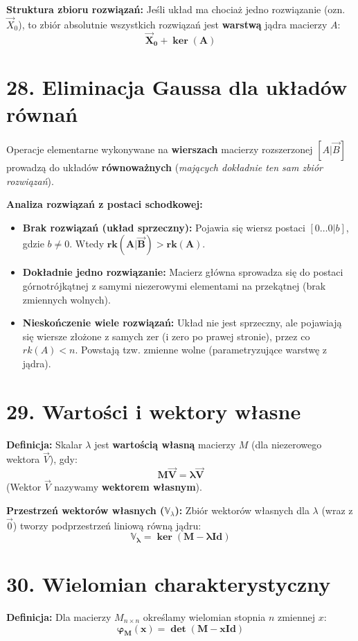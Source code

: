 \documentclass[12pt,a4paper]{article}
\begin{document}
\noindent\textbf{Struktura zbioru rozwiązań:} Jeśli układ ma chociaż jedno rozwiązanie (ozn. $\vec{X}_0$), to zbiór absolutnie wszystkich rozwiązań jest \textbf{warstwą} jądra macierzy $A$: %
$$ \mathbf{\vec{X}_0 + \ker(A)} $$ %

\section*{28. Eliminacja Gaussa dla układów równań}
Operacje elementarne wykonywane na \textbf{wierszach} macierzy rozszerzonej $[A|\vec{B}]$ prowadzą do układów \textbf{równoważnych} (\textit{mających dokładnie ten sam zbiór rozwiązań}). %

\noindent\textbf{Analiza rozwiązań z postaci schodkowej:} %
\begin{itemize}
    \item \textbf{Brak rozwiązań (układ sprzeczny):} Pojawia się wiersz postaci $[0 \dots 0 | b]$, gdzie $b \neq 0$. Wtedy $\mathbf{rk(A|\vec{B}) > rk(A)}$. %
    \item \textbf{Dokładnie jedno rozwiązanie:} Macierz główna sprowadza się do postaci górnotrójkątnej z samymi niezerowymi elementami na przekątnej (brak zmiennych wolnych). %
    \item \textbf{Nieskończenie wiele rozwiązań:} Układ nie jest sprzeczny, ale pojawiają się wiersze złożone z samych zer (i zero po prawej stronie), przez co $rk(A) < n$. Powstają tzw. zmienne wolne (parametryzujące warstwę z jądra). %
\end{itemize}

\section*{29. Wartości i wektory własne}
\noindent\textbf{Definicja:} Skalar $\lambda$ jest \textbf{wartością własną} macierzy $M$ (dla niezerowego wektora $\vec{V}$), gdy: %
$$ \mathbf{M\vec{V} = \lambda\vec{V}} $$
(Wektor $\vec{V}$ nazywamy \textbf{wektorem własnym}). %

\noindent\textbf{Przestrzeń wektorów własnych ($\mathbb{V}_\lambda$):} Zbiór wektorów własnych dla $\lambda$ (wraz z $\vec{0}$) tworzy podprzestrzeń liniową równą jądru: %
$$ \mathbf{\mathbb{V}_\lambda = \ker(M - \lambda Id)} $$ %

\section*{30. Wielomian charakterystyczny}
\noindent\textbf{Definicja:} Dla macierzy $M_{n \times n}$ określamy wielomian stopnia $n$ zmiennej $x$: %
$$ \mathbf{\varphi_M(x) = \det(M - x Id)} $$ %
\end{document}
